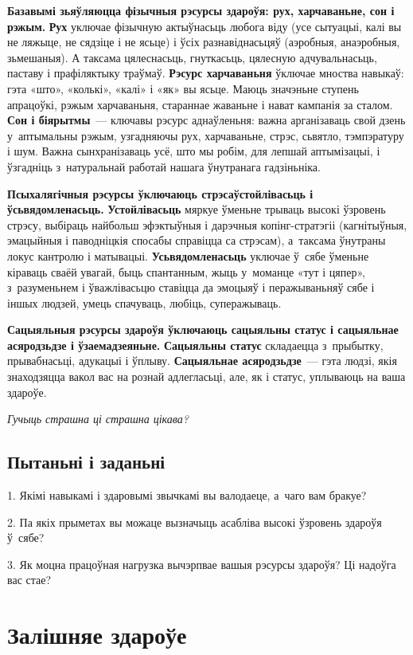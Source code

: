 \textbf{Базавымі зьяўляюцца фізычныя рэсурсы здароўя: рух, харчаваньне, сон і рэжым.} \textbf{Рух} уключае фізычную актыўнасьць любога віду (усе сытуацыі, калі вы не ляжыце, не сядзіце і не ясьце) і ўсіх разнавіднасьцяў (аэробныя, анаэробныя, зьмешаныя). А таксама цялеснасьць, гнуткасьць, цялесную адчувальнасьць, паставу і прафіляктыку траўмаў.
\textbf{Рэсурс харчаваньня} ўключае мноства навыкаў: гэта «што», «колькі», «калі» і «як» вы ясьце. Маюць значэньне ступень апрацоўкі, рэжым харчаваньня, стараннае жаваньне і нават кампанія за сталом.
\textbf{Сон і біярытмы}~--- ключавы рэсурс аднаўленьня: важна арганізаваць свой дзень у~аптымальны рэжым, узгадняючы рух, харчаваньне, стрэс, сьвятло, тэмпэратуру і шум. Важна сынхранізаваць усё, што мы робім, для лепшай аптымізацыі, і ўзгадніць з~натуральнай работай нашага ўнутранага гадзіньніка.

\textbf{Псыхалягічныя рэсурсы ўключаюць стрэсаўстойлівасьць і ўсьвядомленасьць.} \textbf{Устойлівасьць} мяркуе ўменьне трываць высокі ўзровень стрэсу, выбіраць найбольш эфэктыўныя і дарэчныя копінг-стратэгіі (кагнітыўныя, эмацыйныя і паводніцкія спосабы справіцца са стрэсам), а~таксама ўнутраны локус кантролю і матывацыі. \textbf{Усьвядомленасьць} уключае ў~сябе ўменьне кіраваць сваёй увагай, быць спантанным, жыць у~моманце «тут і цяпер», з~разуменьнем і ўважлівасьцю ставіцца да эмоцыяў і перажываньняў сябе і іншых людзей, умець спачуваць, любіць, суперажываць.

\textbf{Сацыяльныя рэсурсы здароўя ўключаюць сацыяльны статус і сацыяльнае асяродзьдзе і ўзаемадзеяньне.} \textbf{Сацыяльны статус} складаецца з~прыбытку, прывабнасьці, адукацыі і ўплыву. \textbf{Сацыяльнае асяродзьдзе}~--- гэта людзі, якія знаходзяцца вакол вас на рознай адлегласьці, але, як і статус, уплываюць на ваша здароўе. 

\emph{Гучыць страшна ці страшна цікава?}


\subsection*{Пытаньні і заданьні}

1. Якімі навыкамі і здаровымі звычкамі вы валодаеце, а~чаго вам бракуе?

2. Па якіх прыметах вы можаце вызначыць асабліва высокі ўзровень здароўя ў~сябе?

3. Як моцна працоўная нагрузка вычэрпвае вашыя рэсурсы здароўя? Ці надоўга вас стае?


\section{Залішняе здароўе}


